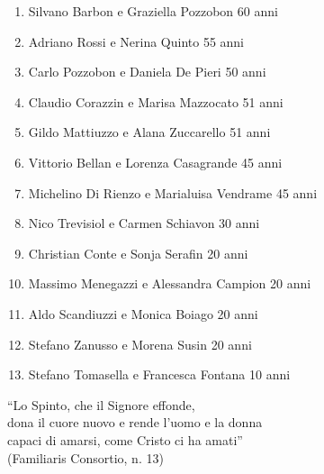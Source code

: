 \begin{enumerate}
  \item Silvano Barbon e Graziella Pozzobon \hfill 60 anni
  \item Adriano Rossi e Nerina Quinto \hfill 55 anni
  \item Carlo Pozzobon e Daniela De Pieri \hfill 50 anni
  \item Claudio Corazzin e Marisa Mazzocato \hfill 51 anni
  \item Gildo Mattiuzzo e Alana Zuccarello \hfill 51 anni
  \item Vittorio Bellan e Lorenza Casagrande \hfill 45 anni
  \item Michelino Di Rienzo e Marialuisa Vendrame \hfill 45 anni
  \item Nico Trevisiol e Carmen Schiavon \hfill 30 anni
  \item Christian Conte e Sonja Serafin \hfill 20 anni
  \item Massimo Menegazzi e Alessandra Campion \hfill 20 anni
  \item Aldo Scandiuzzi e Monica Boiago \hfill 20 anni
  \item Stefano Zanusso e Morena Susin \hfill 20 anni
  \item Stefano Tomasella e Francesca Fontana \hfill 10 anni
\end{enumerate}

\begin{center}
``Lo Spinto, che il Signore effonde,\\
dona il cuore nuovo e rende l'uomo e la donna\\
capaci di amarsi, come Cristo ci ha amati''\\
(Familiaris Consortio, n. 13)
\end{center}
